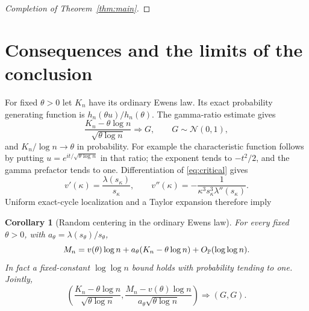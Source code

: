 \documentclass[11pt]{article}
\newtheorem{corollary}[theorem]{Corollary}
\theoremstyle{definition}\newtheorem{definition}[theorem]{Definition}
\theoremstyle{remark}\newtheorem{remark}[theorem]{Remark}
\newcommand{\Op}{O_{\Pp}}\newcommand{\eps}{\varepsilon}
\numberwithin{equation}{section}\allowdisplaybreaks
\begin{document}
\begin{proof}[Completion of Theorem~\ref{thm:main}]
\end{proof}

\section{Consequences and the limits of the conclusion}\label{sec:consequences}
For fixed $\theta>0$ let $K_n$ have its ordinary Ewens law. Its exact
probability generating function is $h_n(\theta u)/h_n(\theta)$.
The gamma-ratio estimate gives
\[
 \frac{K_n-\theta\log n}{\sqrt{\theta\log n}}\Longrightarrow G,
 \qquad G\sim\mathcal N(0,1),
\]
and $K_n/\log n\to\theta$ in probability. For example the characteristic
function follows by putting $u=e^{it/\sqrt{\theta\log n}}$ in that
ratio; the exponent tends to $-t^2/2$, and the gamma prefactor tends to
one. Differentiation of \eqref{eq:critical} gives
\begin{equation}\label{eq:v-derivatives}
 v'(\kappa)=\frac{\lambda(s_\kappa)}{s_\kappa},\qquad
 v''(\kappa)=-\frac1{\kappa^3s_\kappa^3\lambda''(s_\kappa)}.
\end{equation}
Uniform exact-cycle localization and a Taylor expansion therefore imply
\begin{corollary}[Random centering in the ordinary Ewens law]
\label{cor:ewens}
For every fixed $\theta>0$, with $a_\theta=\lambda(s_\theta)/s_\theta$,
\[
 M_n=v(\theta)\log n+a_\theta(K_n-\theta\log n)+\Op(\log\log n).
\]
In fact a fixed-constant $\log\log n$ bound holds with probability tending
to one. Jointly,
\[
 \left(\frac{K_n-\theta\log n}{\sqrt{\theta\log n}},
       \frac{M_n-v(\theta)\log n}{a_\theta\sqrt{\theta\log n}}\right)
 \Longrightarrow(G,G).
\]
\end{corollary}
\end{document}
